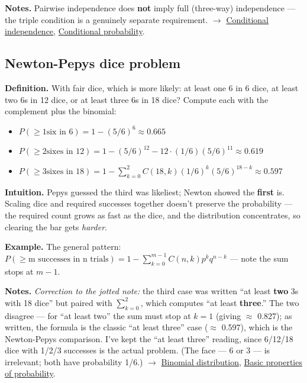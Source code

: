 \documentclass[11pt,a4paper]{article}
\begin{document}
\textbf{Notes.} Pairwise independence does \textbf{not} imply full (three-way) independence --- the triple condition is a genuinely separate requirement. $\to$ \hyperref[sec:conditional-independence]{Conditional independence}, \hyperref[sec:conditional-probability]{Conditional probability}.

\subsection{Newton-Pepys dice problem}\label{sec:newton-pepys-dice-problem}

\textbf{Definition.} With fair dice, which is more likely: at least one 6 in 6 dice, at least two 6s in 12 dice, or at least three 6s in 18 dice? Compute each with the complement plus the binomial:
\begin{itemize}[leftmargin=1.4em]
\item $P(\geq 1 \text{six in 6}) = 1 - (5/6)^{6} \approx  0.665$
\item $P(\geq 2 \text{sixes in 12}) = 1 - (5/6)^{12} - 12\cdot (1/6)(5/6)^{11} \approx  0.619$
\item $P(\geq 3 \text{sixes in 18}) = 1 - \sum _{k=0}^{2} C(18,k)(1/6)^{k}(5/6)^{18-k} \approx  0.597$
\end{itemize}

\textbf{Intuition.} Pepys guessed the third was likeliest; Newton showed the \textbf{first} is. Scaling dice and required successes together doesn't preserve the probability --- the required count grows as fast as the dice, and the distribution concentrates, so clearing the bar gets \textit{harder}.

\textbf{Example.} The general pattern: $P(\geq  \text{m successes in n trials}) = 1 - \sum _{k=0}^{m-1} C(n,k) p^{k} q^{n-k}$ --- note the sum stops at \textbf{$m - 1$}.

\textbf{Notes.} \textit{Correction to the jotted note:} the third case was written ``at least \textbf{two} 3s with 18 dice'' but paired with $\sum _{k=0}^{2}$, which computes ``at least \textbf{three}.'' The two disagree --- for ``at least two'' the sum must stop at $k = 1$ (giving $\approx$ 0.827); as written, the formula is the classic ``at least three'' case ($\approx$ 0.597), which is the Newton-Pepys comparison. I've kept the ``at least three'' reading, since 6/12/18 dice with 1/2/3 successes is the actual problem. (The face --- 6 or 3 --- is irrelevant; both have probability 1/6.) $\to$ \hyperref[sec:binomial-distribution]{Binomial distribution}, \hyperref[sec:basic-properties-of-probability]{Basic properties of probability}.
\end{document}
